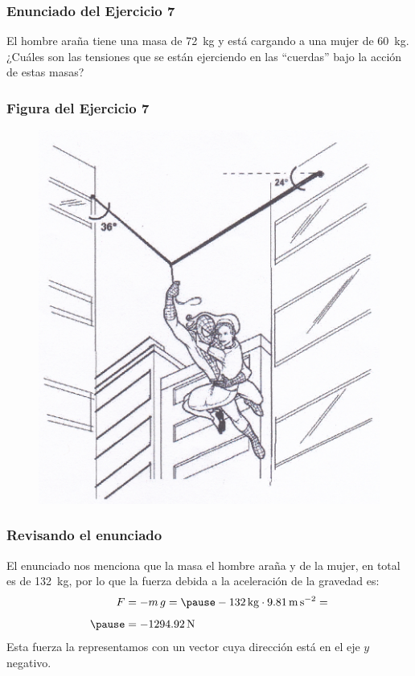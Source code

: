 \documentclass[12pt]{beamer}
\begin{document}
\begin{frame}
\frametitle{Enunciado del Ejercicio 7}
El hombre araña tiene una masa de \SI{72}{\kilo\gram} y está cargando a una mujer de \SI{60}{\kilo\gram}.
\\
\bigskip
\pause
¿Cuáles son las tensiones que se están ejerciendo en las \enquote{cuerdas} bajo la acción de estas masas?
\end{frame}
\begin{frame}
\frametitle{Figura del Ejercicio 7}
\begin{figure}
  \centering
  \includegraphics[scale=0.81]{Imagenes/DCL_Problema_07.png}
\end{figure}
\end{frame}
\begin{frame}
\frametitle{Revisando el enunciado}
El enunciado nos menciona que la masa el hombre araña y de la mujer, en total es de \SI{132}{\kilo\gram}, por lo que la fuerza debida a la aceleración de la gravedad es:
\pause
\begin{eqnarray*}
\begin{aligned}
F &= - m \, g = \pause - \SI{132}{\kilogram} \cdot \SI{9.81}{\meter\per\square\second} = \\[0.5em] \pause
&= - \SI{1294.92}{\newton}
\end{aligned}
\end{eqnarray*}
\pause
Esta fuerza la representamos con un vector cuya dirección está en el eje $y$ negativo.
\end{frame}
\end{document}
